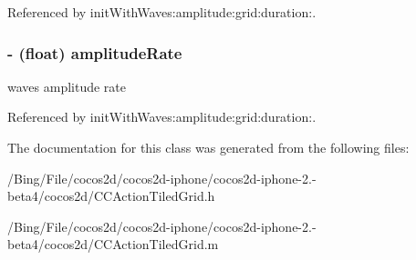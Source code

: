 Referenced by init\-With\-Waves\-:amplitude\-:grid\-:duration\-:.

\hypertarget{interface_c_c_waves_tiles3_d_abea72fd3b311cfbccb35bd7e8dcb0555}{
\subsubsection[{amplitude\-Rate}]{\setlength{\rightskip}{0pt plus 5cm}-\/ (float) {\bf amplitude\-Rate}}}\label{interface_c_c_waves_tiles3_d_abea72fd3b311cfbccb35bd7e8dcb0555}
waves amplitude rate 

Referenced by init\-With\-Waves\-:amplitude\-:grid\-:duration\-:.



The documentation for this class was generated from the following files\-:\begin{DoxyCompactItemize}
\item 
/\-Bing/\-File/cocos2d/cocos2d-\/iphone/cocos2d-\/iphone-\/2.-\/beta4/cocos2d/C\-C\-Action\-Tiled\-Grid.\-h\item 
/\-Bing/\-File/cocos2d/cocos2d-\/iphone/cocos2d-\/iphone-\/2.-\/beta4/cocos2d/C\-C\-Action\-Tiled\-Grid.\-m\end{DoxyCompactItemize}
